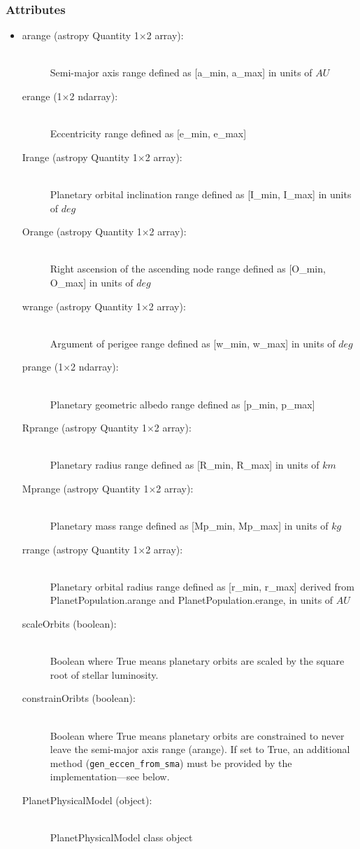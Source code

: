 \documentclass[cleanfoot]{asme2ej}
\begin{document}
\subsubsection*{Attributes}
\begin{itemize}
    \item
    \begin{description}
        \item[arange (astropy Quantity 1$\times$2 array):] \hfill \\
        Semi-major axis range defined as [a\_min, a\_max] in units of $ AU $
        \item[erange (1$\times$2 ndarray):] \hfill \\
        Eccentricity range defined as [e\_min, e\_max]
        \item[Irange (astropy Quantity 1$\times$2 array):] \hfill \\
        Planetary orbital inclination range defined as [I\_min, I\_max] in units of $ deg $
        \item[Orange (astropy Quantity 1$\times$2 array):] \hfill \\
        Right ascension of the ascending node range defined as [O\_min, O\_max] in units of $ deg $
        \item[wrange (astropy Quantity 1$\times$2 array):] \hfill \\
        Argument of perigee range defined as [w\_min, w\_max] in units of $ deg $
        \item[prange (1$\times$2 ndarray):] \hfill \\
        Planetary geometric albedo range defined as [p\_min, p\_max]
        \item[Rprange (astropy Quantity 1$\times$2 array):] \hfill \\
        Planetary radius range defined as [R\_min, R\_max] in units of $ km $
        \item[Mprange (astropy Quantity 1$\times$2 array):] \hfill \\
        Planetary mass range defined as [Mp\_min, Mp\_max] in units of $ kg $
        \item[rrange (astropy Quantity 1$\times$2 array):] \hfill \\
        Planetary orbital radius range defined as [r\_min, r\_max] derived from PlanetPopulation.arange and PlanetPopulation.erange, in units of $ AU $
        \item [scaleOrbits (boolean):] \hfill \\
        Boolean where True means planetary orbits are scaled by the square root of stellar luminosity.
        \item[constrainOribts (boolean):] \hfill \\
        Boolean where True means planetary orbits are constrained to never leave the semi-major axis range (arange). If set to True, an additional method (\verb+gen_eccen_from_sma+) must be provided by the implementation---see below.
        \item[PlanetPhysicalModel (object):] \hfill \\     
            PlanetPhysicalModel class object
    \end{description}
\end{itemize}
\end{document}
